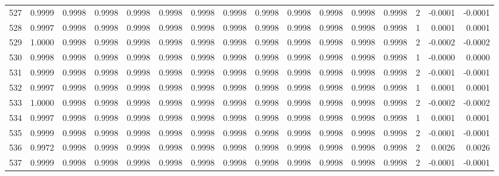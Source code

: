 \begin{tabular}{lrrrrrrrrrrrrrrr}
527 &      0.9999 &  0.9998 &  0.9998 &  0.9998 &  0.9998 &  0.9998 &  0.9998 &  0.9998 &  0.9998 &  0.9998 &   0.9998 &     0.9998 &      2 &                   -0.0001 &                    -0.0001 \\
528 &      0.9997 &  0.9998 &  0.9998 &  0.9998 &  0.9998 &  0.9998 &  0.9998 &  0.9998 &  0.9998 &  0.9998 &   0.9998 &     0.9998 &      1 &                    0.0001 &                     0.0001 \\
529 &      1.0000 &  0.9998 &  0.9998 &  0.9998 &  0.9998 &  0.9998 &  0.9998 &  0.9998 &  0.9998 &  0.9998 &   0.9998 &     0.9998 &      2 &                   -0.0002 &                    -0.0002 \\
530 &      0.9998 &  0.9998 &  0.9998 &  0.9998 &  0.9998 &  0.9998 &  0.9998 &  0.9998 &  0.9998 &  0.9998 &   0.9998 &     0.9998 &      1 &                   -0.0000 &                     0.0000 \\
531 &      0.9999 &  0.9998 &  0.9998 &  0.9998 &  0.9998 &  0.9998 &  0.9998 &  0.9998 &  0.9998 &  0.9998 &   0.9998 &     0.9998 &      2 &                   -0.0001 &                    -0.0001 \\
532 &      0.9997 &  0.9998 &  0.9998 &  0.9998 &  0.9998 &  0.9998 &  0.9998 &  0.9998 &  0.9998 &  0.9998 &   0.9998 &     0.9998 &      1 &                    0.0001 &                     0.0001 \\
533 &      1.0000 &  0.9998 &  0.9998 &  0.9998 &  0.9998 &  0.9998 &  0.9998 &  0.9998 &  0.9998 &  0.9998 &   0.9998 &     0.9998 &      2 &                   -0.0002 &                    -0.0002 \\
534 &      0.9997 &  0.9998 &  0.9998 &  0.9998 &  0.9998 &  0.9998 &  0.9998 &  0.9998 &  0.9998 &  0.9998 &   0.9998 &     0.9998 &      1 &                    0.0001 &                     0.0001 \\
535 &      0.9999 &  0.9998 &  0.9998 &  0.9998 &  0.9998 &  0.9998 &  0.9998 &  0.9998 &  0.9998 &  0.9998 &   0.9998 &     0.9998 &      2 &                   -0.0001 &                    -0.0001 \\
536 &      0.9972 &  0.9998 &  0.9998 &  0.9998 &  0.9998 &  0.9998 &  0.9998 &  0.9998 &  0.9998 &  0.9998 &   0.9998 &     0.9998 &      2 &                    0.0026 &                     0.0026 \\
537 &      0.9999 &  0.9998 &  0.9998 &  0.9998 &  0.9998 &  0.9998 &  0.9998 &  0.9998 &  0.9998 &  0.9998 &   0.9998 &     0.9998 &      2 &                   -0.0001 &                    -0.0001 \\

\end{tabular}
